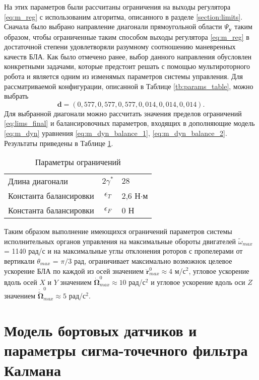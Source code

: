 На этих параметров были рассчитаны ограничения на выходы регулятора \ref{eq:m_reg} с использованим алгоритма, описанного в разделе \ref{section:limits}. Сначала было выбрано направление диагонали прямоугольной области $\Psi_{\boldsymbol{y}}$ таким образом, чтобы ограниченные таким способом выходы регулятора \eqref{eq:m_reg} в достаточной степени удовлетворяли разумному соотношению маневренных качеств БЛА. Как было отмечено ранее, выбор данного направления обусловлен конкретными задачами, которые предстоит решать с помощью мультироторного робота и является одним из изменямых параметров системы управления. Для рассматриваемой конфигурации, описанной в Таблице \ref{tb:params_table}, можно выбрать
$$\bm d = (0,577, 0,577, 0,577, 0,014, 0,014, 0,014).$$
Для выбранной диагонали можно рассчитать значения пределов ограничений \eqref{eq:lims_final} и балансировочных параметров, входящих в дополняющие модель \eqref{eq:m_dyn} уравнения \ref{eq:m_dyn_balance_1}, \ref{eq:m_dyn_balance_2}. Результаты приведены в Таблице \ref{tb:lims_table}.
\begin{table}[h!]
	\centering
	\caption{Параметры ограничений}\label{tb:lims_table} 
	\begin{tabular}{lcl}
		\hline	
		Длина диагонали & $2\gamma^*$ & $28$ \\
		Константа балансировки & $\epsilon_T$ &2,6 Н$\cdot$м \\
		Константа балансировки & $\epsilon_F$ &0 Н\\
		\hline
	\end{tabular}
\end{table}
Таким образом выполнение имеющихся ограничений параметров системы исполнительных органов управления на максимальные обороты двигателей
$\tilde \omega_{max}$ = 1140 рад/с
и на максимальные углы отклонения роторов с пропелерами от вертикали
$\theta_{max}$ = ${\pi}/{3}$ рад,
ограничивает максимально возможнок целевое ускорение БЛА по каждой из осей значением
$\ddot {\bm r}_{max}^0 \approx 4$ м/с$^2$,
угловое ускорение вдоль осей $X$ и $Y$ значением
$\dot {\bm \Omega}_{max}^0 \approx 10$ рад/с$^2$
и угловое ускорение вдоль оси $Z$ значением
$\dot {\tilde{\bm \Omega}}_{max}^0 \approx 5$ рад/с$^2$.

\section{Модель бортовых датчиков и параметры сигма-точечного фильтра Калмана}

